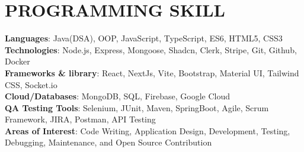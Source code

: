 \section{PROGRAMMING SKILL}
    \begin{itemize}[leftmargin=0.15in, label={}]
	\small{\item{
		\textbf{Languages}{: Java(DSA), OOP, JavaScript, TypeScript, ES6,  HTML5, CSS3} \\
		\textbf{Technologies}{: Node.js, Express, Mongoose, Shadcn, Clerk, Stripe, Git, Github, Docker} \\
		\textbf{Frameworks \& library}{: React, NextJs, Vite, Bootstrap, Material UI, Tailwind CSS, Socket.io} \\
  		\textbf{Cloud/Databases}{: MongoDB, SQL, Firebase, Google Cloud} \\
		\textbf{QA Testing Tools}{: Selenium, JUnit, Maven, SpringBoot, Agile, Scrum Framework, JIRA, Postman, API Testing} \\
		\textbf{Areas of Interest}{: Code Writing, Application Design, Development, Testing, Debugging, Maintenance, and Open Source Contribution}
	}}
    \end{itemize}